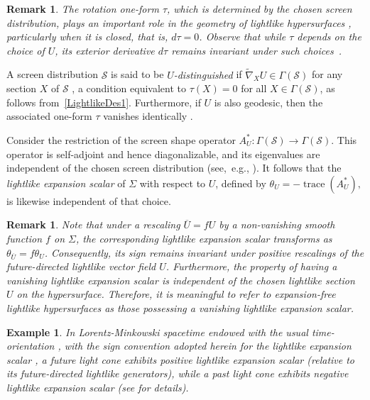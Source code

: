 \documentclass[11pt]{article}
\numberwithin{equation}{section}
\newtheorem{remark}[theorem]{Remark}
\newtheorem{example}[theorem]{Example}
\begin{document}
\begin{remark}\label{remark:dtau_ditinghished}\normalfont 
	The rotation one-form $\tau$, which is determined by the chosen screen distribution, plays an important role in the geometry of lightlike hypersurfaces \cite{DuggalSharma}, particularly when it is closed, that is, $d\tau=0$. Observe that while $\tau$ depends on the choice of $U$, its exterior derivative $d\tau$ remains invariant under such choices~\cite[Prop.~2.3.1]{Duggal_Sahin}.
\end{remark}
	
	 A screen distribution ${\mathcal S}$ is said to be \emph{$U$-distinguished} if $\widetilde{\nabla}_X U \in \Gamma({\mathcal S})$ for any section $X$ of ${\mathcal S}$ \cite{DuggalGimenez}, a condition equivalent to $\tau(X)=0$ for all $X\in\Gamma({\mathcal S})$, as follows from~\eqref{LightlikeDes1}. Furthermore, if $U$ is also geodesic, then the associated one-form $\tau$ vanishes identically \cite[Prop.~4]{DuggalGimenez}.

Consider the restriction of the screen shape operator
$
A^{*}_{U}\colon \Gamma(\mathcal{S}) \to \Gamma(\mathcal{S}).
$
This operator is self-adjoint and hence diagonalizable, and its eigenvalues are independent of the chosen screen distribution (see,~e.g., \cite[Lem.~1]{DuggalGimenez}). It follows that the \emph{lightlike expansion scalar} of \(\Sigma\) with respect to \(U\), defined by
$
\theta_{U}= -\operatorname{trace}(A^{*}_{U}),
$
is likewise independent of that choice.
	
	\begin{remark} \normalfont \label{remark:sign_theta}
		Note that under a rescaling $\overline{U} = fU$ by a non-vanishing smooth function $f$ on $\Sigma$, the corresponding lightlike expansion scalar transforms as $\theta_{\overline{U}}= f\theta_U$. Consequently, its sign remains invariant under positive rescalings of the future-directed lightlike vector field $U$. Furthermore, the property of having a vanishing lightlike expansion scalar is independent of the chosen lightlike section $U$ on the hypersurface. Therefore, it is meaningful to refer to \emph{expansion-free} lightlike hypersurfaces as those possessing a vanishing lightlike expansion scalar.
	\end{remark}
	
	\begin{example} \normalfont In Lorentz-Minkowski spacetime endowed with the usual time-orientation \cite{oneill}, with the sign convention adopted herein for the lightlike expansion scalar \cite{DuggalGimenez}, a future light cone exhibits positive lightlike expansion scalar (relative to its future-directed lightlike generators), while a past light cone exhibits negative lightlike expansion scalar (see \cite{Bejancu1996} for details).
	\end{example}
	
\end{document}
